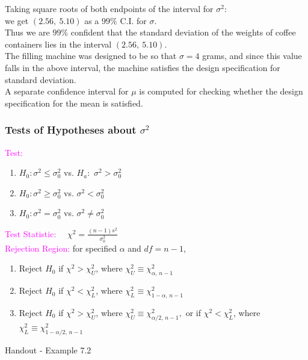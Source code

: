 \documentclass[xcolor=dvipsnames,12pt]{beamer}
\begin{document}
\begin{frame}
Taking square roots of both endpoints of the interval for $\sigma^2$:\\[.1in]
\hspace*{.6in} we get  $(2.56,\ 5.10 )$ as a $99\%$ C.I. for $\sigma$.\\[.1in]
 Thus we are  $99\%$ confident that the standard deviation of the
weights of coffee containers lies in the interval  $(2.56,\ 5.10 )$.\\[.1in]
The filling machine was designed to be so that $\sigma = 4$ grams,
and since this value falls in the above interval, the
machine satisfies the design specification for standard deviation.\\[.1in]
 A separate confidence interval for $\mu$ is computed for
checking whether  the design specification for the mean is
satisfied. 
\end{frame}


\begin{frame}
\frametitle{Tests of Hypotheses about $\sigma^2$}
\textcolor{magenta}{Test:}
\begin{enumerate}
\item $H_0: \sigma^2 \leq \sigma_0^2$ vs. $H_a:$  $\sigma^2 > \sigma_0^2$
\item $H_0: \sigma^2 \geq \sigma_0^2$ vs. $\sigma^2 < \sigma_0^2$
\item $H_0: \sigma^2 =\sigma_0^2$ vs.  $\sigma^2 \neq \sigma_0^2$
\end{enumerate}
{\textcolor{magenta}{Test Statistic:}} \ \ $\chi^2 = \frac{(n-1)s^2}{\sigma_0^2}$\\
{\textcolor{magenta}{Rejection Region:}}  for specified $\alpha$ and $df= n-1$,\\
\begin{enumerate}
\item Reject $H_0$ if $\chi^2 > \chi_U^2$, where $\chi_U^2\equiv\chi_{\alpha,\,n-1}^2$
\item Reject $H_0$ if $\chi^2 < \chi_L^2$, where $\chi_L^2\equiv\chi_{1-\alpha,\,n-1}^2$
\item Reject $H_0$ if $\chi^2 > \chi_U^2$, where $\chi_U^2\equiv\chi_{\alpha/2,\,n-1}^2,$
 or if $\chi^2 < \chi_L^2$, where $\chi_L^2\equiv\chi_{1-\alpha/2,\,n-1}^2$
\end{enumerate}
\end{frame}

%
%
\begin{frame}
Handout - Example 7.2
\end{frame}
\end{document}

